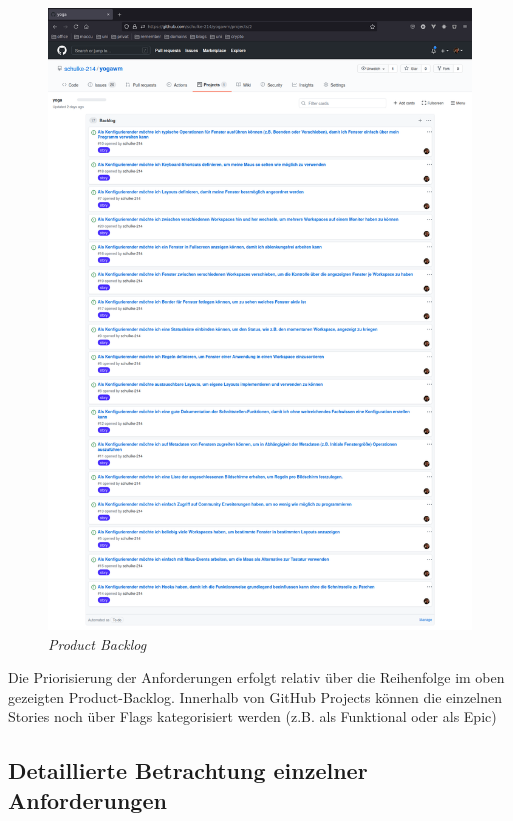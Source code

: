 \documentclass{article}
\begin{document}
\begin{figure}[ht]
	\includegraphics[width=1\textwidth]{product-backlog}
	\centering
	\caption{\emph{Product Backlog}}
	\label{fig:backlog}
\end{figure}

\vspace{1em}

Die Priorisierung der Anforderungen erfolgt relativ über die Reihenfolge im oben gezeigten Product-Backlog.
Innerhalb von GitHub Projects können die einzelnen Stories noch über Flags kategorisiert werden (z.B. als
Funktional oder als Epic)

\subsection{Detaillierte Betrachtung einzelner Anforderungen}
\end{document}
